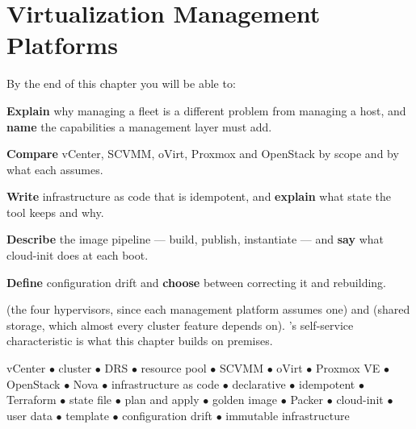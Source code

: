 \chapter{Virtualization Management Platforms}\label{ch:management}

\begin{outcomes}
By the end of this chapter you will be able to:
\begin{tight}
  \item \textbf{Explain} why managing a fleet is a different problem from
        managing a host, and \textbf{name} the capabilities a management layer
        must add.
  \item \textbf{Compare} vCenter, SCVMM, oVirt, Proxmox and OpenStack by scope
        and by what each assumes.
  \item \textbf{Write} infrastructure as code that is idempotent, and
        \textbf{explain} what state the tool keeps and why.
  \item \textbf{Describe} the image pipeline --- build, publish,
        instantiate --- and \textbf{say} what cloud-init does at each boot.
  \item \textbf{Define} configuration drift and \textbf{choose} between
        correcting it and rebuilding.
\end{tight}
\end{outcomes}

\begin{prereq}
 (the four hypervisors, since each management platform assumes
one) and  (shared storage, which almost every cluster feature
depends on). 's self-service characteristic is what this chapter
builds on premises.
\end{prereq}

\begin{keyterms}
vCenter $\bullet$ cluster $\bullet$ DRS $\bullet$ resource pool $\bullet$ SCVMM
$\bullet$ oVirt $\bullet$ Proxmox VE $\bullet$ OpenStack $\bullet$ Nova
$\bullet$ infrastructure as code $\bullet$ declarative $\bullet$ idempotent
$\bullet$ Terraform $\bullet$ state file $\bullet$ plan and apply $\bullet$
golden image $\bullet$ Packer $\bullet$ cloud-init $\bullet$ user data $\bullet$
template $\bullet$ configuration drift $\bullet$ immutable infrastructure
\end{keyterms}


